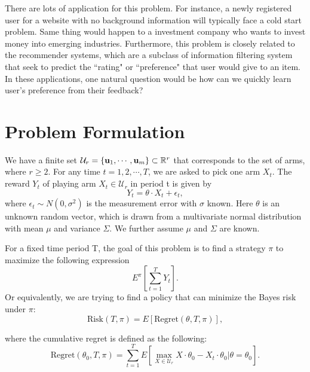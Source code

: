 \documentclass{article}
\theoremstyle{plain}
\theoremstyle{definition}
\begin{document}
There are lots of application for this problem. For instance, a newly registered user for a website with no background information will typically face a cold start problem. Same thing would happen to a investment company who wants to invest money into emerging industries. Furthermore, this problem is closely related to the recommender systems, which are a subclass of information filtering system that seek to predict the ``rating" or ``preference" that user would give to an item. In these applications, one natural question would be how can we quickly learn user's preference from their feedback?





\section{Problem Formulation}
We have a finite set $\mathcal{U}_{r}=\{\bold{u}_{1},\cdots,\bold{u}_{m}\}\subset \mathbb{R}^{r}$ that corresponds to the set of arms, where $r\geq 2$. For any time $t=1,2,\cdots,T$, we are asked to pick one arm $X_{t}$. The reward $Y_{t}$ of playing arm $X_{t}\in \mathcal{U}_{r}$ in period t is given by
\begin{equation}
Y_{t} = \theta \cdot X_{t} + \epsilon_{t}, \nonumber
\end{equation}
where $\epsilon_{t}\sim N(0,\sigma^{2})$ is the measurement error with $\sigma$ known. Here $\theta$ is an unknown random vector, which is drawn from a multivariate normal distribution with mean $\mu$ and variance $\Sigma$. We further assume $\mu$ and $\Sigma$ are known.

For a fixed time period T, the goal of this problem is to find a strategy $\pi$ to maximize the following expression
\begin{equation}
E^{\pi}\left[\sum_{t=1}^{T} Y_{t}\right].
\end{equation}
Or equivalently, we are trying to find a policy that can minimize the Bayes risk under $\pi$:
\begin{equation}
\text{Risk}(T,\pi) = E\left[\text{Regret}(\theta,T,\pi)\right],
\end{equation}

where the cumulative regret is defined as the following:
\begin{equation}
\text{Regret}(\theta_{0},T,\pi)=\sum_{t=1}^{T}E\left[\max_{X\in \mathcal{U}_{r}}X\cdot\theta_{0}-X_{t}\cdot \theta_{0}|\theta=\theta_{0}\right].
\end{equation}
\end{document}

